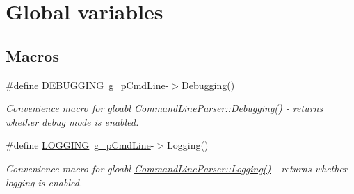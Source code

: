 \hypertarget{group___global_variables}{\section{Global variables}
\label{group___global_variables}
}
\subsection*{Macros}
\begin{DoxyCompactItemize}
\item 
\hypertarget{group___global_variables_ga7180786c98af534f76855fef6f1b97ab}{\#define \hyperlink{group___global_variables_ga7180786c98af534f76855fef6f1b97ab}{D\-E\-B\-U\-G\-G\-I\-N\-G}~\hyperlink{group___global_variables_ga270fc6d9322b018e011978d6376f43ba}{g\-\_\-p\-Cmd\-Line}-\/$>$Debugging()}\label{group___global_variables_ga7180786c98af534f76855fef6f1b97ab}

\begin{DoxyCompactList}\small\item\em Convenience macro for gloabl \hyperlink{class_command_line_parser_ac50e9de49d6e16174f6d5cf3f89c76d7}{Command\-Line\-Parser\-::\-Debugging()} -\/ returns whether debug mode is enabled. \end{DoxyCompactList}\item 
\hypertarget{group___global_variables_ga24a31f60b063af0e662125ea2427b140}{\#define \hyperlink{group___global_variables_ga24a31f60b063af0e662125ea2427b140}{L\-O\-G\-G\-I\-N\-G}~\hyperlink{group___global_variables_ga270fc6d9322b018e011978d6376f43ba}{g\-\_\-p\-Cmd\-Line}-\/$>$Logging()}\label{group___global_variables_ga24a31f60b063af0e662125ea2427b140}

\begin{DoxyCompactList}\small\item\em Convenience macro for gloabl \hyperlink{class_command_line_parser_aaa2d8544c7841c33c560bb4410144154}{Command\-Line\-Parser\-::\-Logging()} -\/ returns whether logging is enabled. \end{DoxyCompactList}\end{DoxyCompactItemize}
